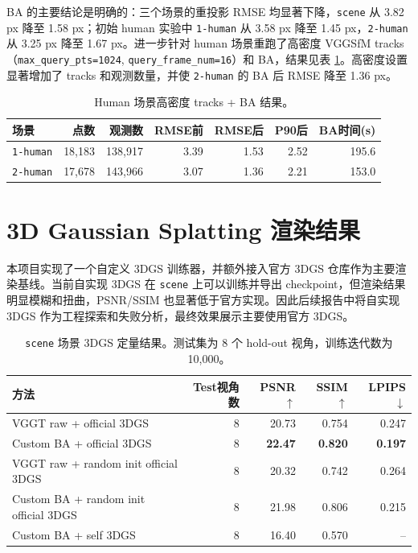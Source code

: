 \documentclass[UTF8,a4paper,11pt]{ctexart}
\begin{document}
BA 的主要结论是明确的：三个场景的重投影 RMSE 均显著下降，\texttt{scene} 从 3.82 px 降至 1.58 px；初始 human 实验中 \texttt{1-human} 从 3.58 px 降至 1.45 px，\texttt{2-human} 从 3.25 px 降至 1.67 px。进一步针对 human 场景重跑了高密度 VGGSfM tracks（\texttt{max\_query\_pts=1024}, \texttt{query\_frame\_num=16}）和 BA，结果见表 \ref{tab:human-hq-ba}。高密度设置显著增加了 tracks 和观测数量，并使 \texttt{2-human} 的 BA 后 RMSE 降至 1.36 px。

\begin{table}[H]
\centering
\caption{Human 场景高密度 tracks + BA 结果。}
\label{tab:human-hq-ba}
\begin{tabular}{lrrrrrr}
\toprule
场景 & 点数 & 观测数 & RMSE前 & RMSE后 & P90后 & BA时间(s) \\
\midrule
\texttt{1-human} & 18,183 & 138,917 & 3.39 & 1.53 & 2.52 & 195.6 \\
\texttt{2-human} & 17,678 & 143,966 & 3.07 & 1.36 & 2.21 & 153.0 \\
\bottomrule
\end{tabular}
\end{table}

\section{3D Gaussian Splatting 渲染结果}

本项目实现了一个自定义 3DGS 训练器，并额外接入官方 3DGS 仓库作为主要渲染基线。当前自实现 3DGS 在 \texttt{scene} 上可以训练并导出 checkpoint，但渲染结果明显模糊和扭曲，PSNR/SSIM 也显著低于官方实现。因此后续报告中将自实现 3DGS 作为工程探索和失败分析，最终效果展示主要使用官方 3DGS。

\begin{table}[H]
\centering
\caption{\texttt{scene} 场景 3DGS 定量结果。测试集为 8 个 hold-out 视角，训练迭代数为 10,000。}
\label{tab:gs-scene}
\begin{tabular}{lrrrr}
\toprule
方法 & Test视角数 & PSNR$\uparrow$ & SSIM$\uparrow$ & LPIPS$\downarrow$ \\
\midrule
VGGT raw + official 3DGS & 8 & 20.73 & 0.754 & 0.247 \\
Custom BA + official 3DGS & 8 & \textbf{22.47} & \textbf{0.820} & \textbf{0.197} \\
VGGT raw + random init official 3DGS & 8 & 20.32 & 0.742 & 0.264 \\
Custom BA + random init official 3DGS & 8 & 21.98 & 0.806 & 0.215 \\
Custom BA + self 3DGS & 8 & 16.40 & 0.570 & -- \\
\bottomrule
\end{tabular}
\end{table}
\end{document}
